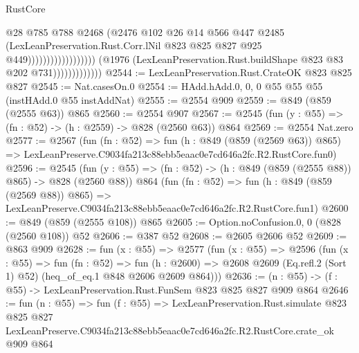 \begin{lexlean}{RustCore}
\begin{coremodule}
                                                          @28
                                                          @785
                                                          @788
                                                          @2468
                                                          (@2476
                                                            @102
                                                            @26
                                                            @14
                                                            @566
                                                            @447
                                                            @2485
                                                            (LexLeanPreservation.Rust.Corr.lNil
                                                              @823
                                                              @825
                                                              @827
                                                              @925
                                                              @449))))))))))))))))))
                          (@1976
                            (LexLeanPreservation.Rust.buildShape @823 @83 @202 @731)))))))))))))
@2544 := LexLeanPreservation.Rust.CrateOK @823 @825 @827
@2545 := Nat.casesOn.{0}
@2554 := HAdd.hAdd.{0, 0, 0} @55 @55 @55 (instHAdd.{0} @55 instAddNat)
@2555 := @2554 @909
@2559 := @849 (@859 (@2555 @63)) @865
@2560 := @2554 @907
@2567 := @2545 (fun (y : @55) => (fn : @52) -> (h : @2559) -> @828 (@2560 @63)) @864
@2569 := @2554 Nat.zero
@2577 := @2567
    (fun (fn : @52) =>
    fun (h : @849 (@859 (@2569 @63)) @865) =>
    LexLeanPreserve.C9034fa213c88ebb5eaac0e7cd646a2fc.R2.RustCore.fun0)
@2596 := @2545
    (fun (y : @55) => (fn : @52) -> (h : @849 (@859 (@2555 @88)) @865) -> @828 (@2560 @88))
    @864
    (fun (fn : @52) =>
    fun (h : @849 (@859 (@2569 @88)) @865) =>
    LexLeanPreserve.C9034fa213c88ebb5eaac0e7cd646a2fc.R2.RustCore.fun1)
@2600 := @849 (@859 (@2555 @108)) @865
@2605 := Option.noConfusion.{0, 0} (@828 (@2560 @108)) @52
@2606 := @387 @52
@2608 := @2605 @2606 @52
@2609 := @863 @909
@2628 := fun (x : @55) =>
  @2577
    (fun (x : @55) =>
    @2596
      (fun (x : @55) =>
      fun (fn : @52) =>
      fun (h : @2600) =>
      @2608 @2609 (Eq.refl.{2} (Sort 1) @52) (heq_of_eq.{1} @848 @2606 @2609 @864)))
@2636 := (n : @55) -> (f : @55) -> LexLeanPreservation.Rust.FunSem @823 @825 @827 @909 @864
@2646 := fun (n : @55) =>
  fun (f : @55) =>
  LexLeanPreservation.Rust.simulate
    @823
    @825
    @827
    LexLeanPreserve.C9034fa213c88ebb5eaac0e7cd646a2fc.R2.RustCore.crate_ok
    @909
    @864
\end{coremodule}
\end{lexlean}
